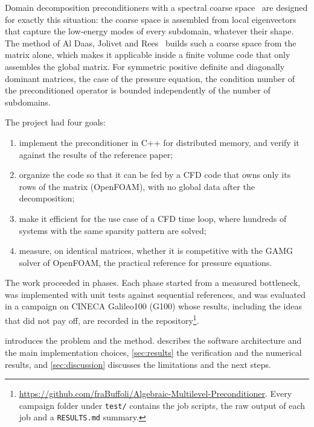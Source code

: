 \documentclass[11pt,a4paper]{article}
\begin{document}
Domain decomposition preconditioners with a spectral coarse space~\cite{Dolean2015} are designed for
exactly this situation: the coarse space is assembled from local eigenvectors that capture the low-energy
modes of every subdomain, whatever their shape. The method of Al Daas, Jolivet and Rees~\cite{AlDaas2023}
builds such a coarse space from the matrix alone, which makes it applicable inside a finite volume code 
that only assembles the global matrix. For symmetric positive definite and diagonally dominant matrices, 
the case of the pressure equation, the condition number of the preconditioned operator is bounded 
independently of the number of subdomains.

The project had four goals:
\begin{enumerate}
\item implement the preconditioner in C++ for distributed memory, and verify it against the results of the
      reference paper;
\item organize the code so that it can be fed by a CFD code that owns only its rows of the matrix
      (OpenFOAM), with no global data after the decomposition;
\item make it efficient for the use case of a CFD time loop, where hundreds of systems with the same
      sparsity pattern are solved;
\item measure, on identical matrices, whether it is competitive with the GAMG solver of OpenFOAM, the
      practical reference for pressure equations.
\end{enumerate}

The work proceeded in phases. Each phase started from a measured bottleneck, was implemented with unit
tests against sequential references, and was evaluated in a campaign on CINECA Galileo100 (G100) whose
results, including the ideas that did not pay off, are recorded in the repository\footnote{%
\url{https://github.com/fraBuffoli/Algebraic-Multilevel-Preconditioner}. Every campaign folder under
\texttt{test/} contains the job scripts, the raw output of each job and a \texttt{RESULTS.md} summary.}.

 introduces the problem and the method.  describes the software
architecture and the main implementation choices, \cref{sec:results} the verification and the numerical
results, and \cref{sec:discussion} discusses the limitations and the next steps.

\end{document}
